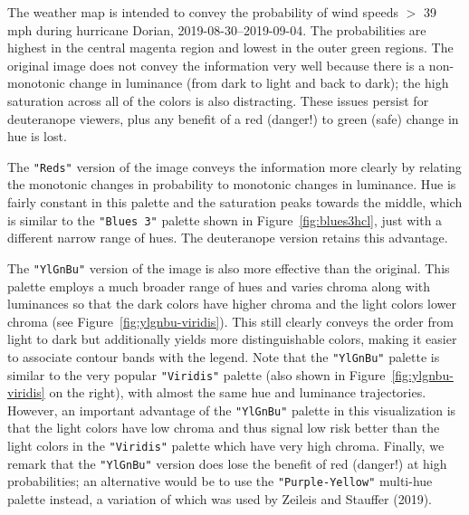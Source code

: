 The weather map is intended to convey
the probability of wind speeds \(>\) 39 mph
during hurricane Dorian, 2019-08-30--2019-09-04. The probabilities are highest
in the central magenta region and lowest in the outer green regions.
The original image does not convey the information very well because
there is a non-monotonic change in luminance
(from dark to light and back to dark); the high saturation across
all of the colors is also distracting. These issues persist for
deuteranope viewers, plus any benefit of a red (danger!) to green (safe)
change in hue is lost.

The \texttt{"Reds"} version of the image conveys the information more clearly
by relating the monotonic changes in probability to monotonic
changes in luminance. Hue is fairly constant in this palette and
the saturation peaks towards the middle, which is similar to the
\texttt{"Blues\ 3"} palette shown in
Figure~\ref{fig:blues3hcl}, just with a different narrow range of hues.
The deuteranope version retains this advantage.

The \texttt{"YlGnBu"} version of the image is also more effective than
the original. This palette employs a much broader range of hues and varies
chroma along with luminances so that the dark colors have higher chroma and
the light colors lower chroma
(see Figure~\ref{fig:ylgnbu-viridis}). This still clearly conveys
the order from light to dark but additionally yields more distinguishable
colors, making it easier to associate contour bands with the legend.
Note that the \texttt{"YlGnBu"} palette is similar to the very popular
\texttt{"Viridis"} palette (also shown in Figure~\ref{fig:ylgnbu-viridis}
on the right), with almost the same hue and luminance trajectories.
However, an important advantage of the \texttt{"YlGnBu"} palette in this
visualization is that the light colors have low chroma and thus signal
low risk better than the light colors in the \texttt{"Viridis"} palette which
have very high chroma. Finally, we remark that the \texttt{"YlGnBu"} version
does lose the benefit of red (danger!) at high probabilities;
an alternative would be to use the \texttt{"Purple-Yellow"} multi-hue palette
instead, a variation of which was used by Zeileis and Stauffer (2019).

